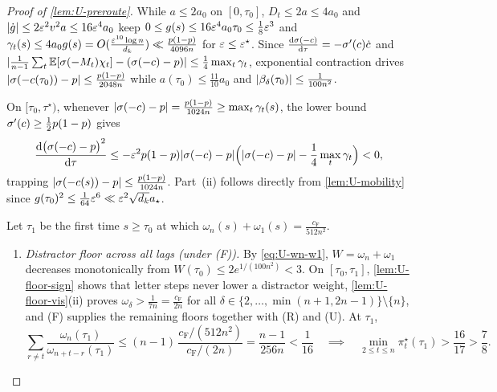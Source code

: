 \begin{proof}[Proof of \cref{lem:U-preroute}]
While $a \le 2a_0$ on $[0, \tau_0]$, $D_t \le 2a \le 4a_0$ and $|\dot g| \le 2\varepsilon^2 v^2 a \le 16\varepsilon^4 a_0$ keep $0 \le g(s) \le 16\varepsilon^4 a_0 \tau_0 \le \frac{1}{8}\varepsilon^3$ and $\gamma_t(s) \le 4a_0 g(s) = O(\frac{\varepsilon^{10}\log n}{d_k}) \ll \frac{p(1-p)}{4096n}$ for $\varepsilon \le \varepsilon^\star$. Since $\ddtau{\sigma(-\cnt)} = -\sigma'(\cnt)\dot\cnt$ and $|\frac{1}{n-1}\sum_t\mathbb E[\sigma(-M_t)\chi_t] - (\sigma(-c) - p)| \le \frac{1}{4}\max_t\gamma_t$, exponential contraction drives $|\sigma(-c(\tau_0)) - p| \le \frac{p(1-p)}{2048n}$ while $a(\tau_0) \le \frac{11}{10}a_0$ and $|\beta_\delta(\tau_0)| \le \frac{1}{100n^2}$.

On $[\tau_0, \tau^\star)$, whenever $|\sigma(-c) - p| = \frac{p(1-p)}{1024n} \ge \max_t\gamma_t(s)$, the lower bound $\sigma'(c) \ge \frac{1}{2}p(1-p)$ gives
\[
  \ddtau{\bigl(\sigma(-\cnt) - p\bigr)^2}
  \le -\initscale^2 p(1-p)\lvert\sigma(-\cnt) - p\rvert\Bigl(\lvert\sigma(-\cnt) - p\rvert - \tfrac{1}{4}\max_t\gamma_t\Bigr) < 0,
\]
trapping $|\sigma(-c(s)) - p| \le \frac{p(1-p)}{1024n}$. Part~(ii) follows directly from \cref{lem:U-mobility} since $g(\tau_0)^2 \le \frac{1}{64}\varepsilon^6 \ll \varepsilon^2\sqrt{d_k}a_\star$.

Let $\tau_1$ be the first time $s \ge \tau_0$ at which $\omega_n(s) + \omega_1(s) = \frac{c_{\mathrm F}}{512n^2}$.
\begin{enumerate}[label=(\alph*),leftmargin=*]
\item \emph{Distractor floor across all lags (under (F)).} By \cref{eq:U-wn-w1}, $W = \omega_n + \omega_1$ decreases monotonically from $W(\tau_0) \le 2e^{1/(100n^2)} < 3$. On $[\tau_0, \tau_1]$, \cref{lem:U-floor-sign} shows that letter steps never lower a distractor weight, \cref{lem:U-floor-vis}(ii) proves $\omega_\delta > \frac{1}{7n} = \frac{c_{\mathrm F}}{2n}$ for all $\delta \in \{2,\ldots,\min(n+1,2n-1)\}\setminus\{n\}$, and (F) supplies the remaining floors together with (R) and (U). At $\tau_1$,
\[
  \sum_{r\ne t}\frac{\omega_n(\tau_1)}{\omega_{n+t-r}(\tau_1)}
  \le (n-1)\,\frac{c_{\mathrm F}/(512n^2)}{c_{\mathrm F}/(2n)}
  = \frac{n-1}{256n} < \frac{1}{16}
  \quad\implies\quad
  \min_{2\le t\le n}\pi_t^\star(\tau_1) > \frac{16}{17} > \frac{7}{8}.
\]


\end{enumerate}
\end{proof}
